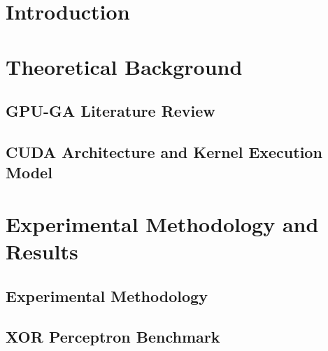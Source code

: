 {}

\newpage

\section{Introduction}

\newpage

\section{Theoretical Background}

\subsection{GPU-GA Literature Review}






\newpage
\subsection{CUDA Architecture and Kernel Execution Model}





\newpage
\section{Experimental Methodology and Results}

\subsection{Experimental Methodology}




\newpage
\subsection{XOR Perceptron Benchmark}

